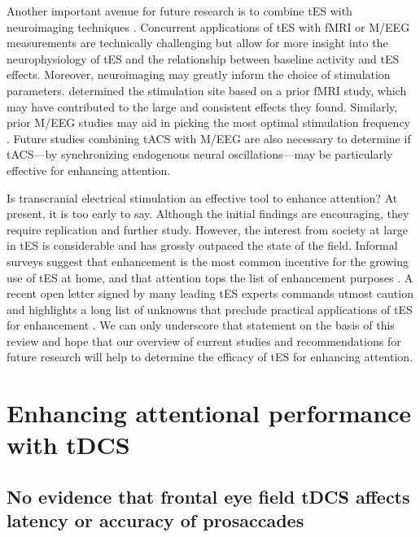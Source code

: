 \documentclass[11pt,]{memoir}
\begin{document}
Another important avenue for future research is to combine tES with neuroimaging techniques \autocite{Bergmann2016}. Concurrent applications of tES with fMRI or M/EEG measurements are technically challenging but allow for more insight into the neurophysiology of tES and the relationship between baseline activity and tES effects. Moreover, neuroimaging may greatly inform the choice of stimulation parameters. \textcite{Clark2012} determined the stimulation site based on a prior fMRI study, which may have contributed to the large and consistent effects they found. Similarly, prior M/EEG studies may aid in picking the most optimal stimulation frequency \autocite{vanDriel2015}. Future studies combining tACS with M/EEG are also necessary to determine if tACS---by synchronizing endogenous neural oscillations---may be particularly effective for enhancing attention.

Is transcranial electrical stimulation an effective tool to enhance attention? At present, it is too early to say. Although the initial findings are encouraging, they require replication and further study. However, the interest from society at large in tES is considerable and has grossly outpaced the state of the field. Informal surveys suggest that enhancement is the most common incentive for the growing use of tES at home, and that attention tops the list of enhancement purposes \autocite{Jwa2015}. A recent open letter signed by many leading tES experts commands utmost caution and highlights a long list of unknowns that preclude practical applications of tES for enhancement \autocite{Wurzman2016}. We can only underscore that statement on the basis of this review and hope that our overview of current studies and recommendations for future research will help to determine the efficacy of tES for enhancing attention.

\hypertarget{part-tDCS}{%
\part{Enhancing attentional performance with tDCS}\label{part-tDCS}}

\hypertarget{sacc-tDCS}{%
\chapter{No evidence that frontal eye field tDCS affects latency or accuracy of prosaccades}\label{sacc-tDCS}}

\end{document}
